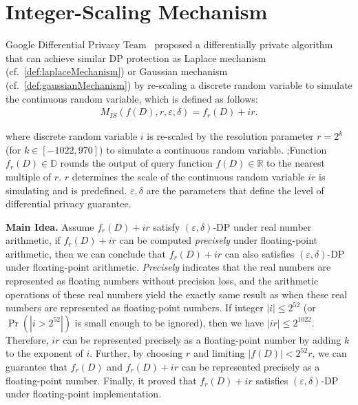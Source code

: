 

\section{Integer-Scaling Mechanism}
\label{sec:integerScalingMechanism}
Google Differential Privacy Team~\cite{googleDP2019} proposed a differentially private algorithm that can achieve similar DP protection as Laplace mechanism (cf.~\autoref{def:laplaceMechanism}) or Gaussian mechanism (cf.~\autoref{def:gaussianMechanism}) by re-scaling a discrete random variable to simulate the continuous random variable, which is defined as follows:
\begin{equation}
    \begin{split}
        M_{IS}\left(f\left(D\right),r, \varepsilon, \delta \right)=f_r\left(D\right) +ir.
    \end{split}
\end{equation}

where discrete random variable $i $ is re-scaled by the resolution parameter $r=2^k$ (for $k \in \left[-1022,970\right] $) to simulate a continuous random variable.
;Function $f_r\left(D\right)\in\mathbb{D} $ rounds the output of query function $f\left(D\right)\in\mathbb{R} $ to the nearest multiple of $r$.
$r$ determines the scale of the continuous random variable $ir$ is simulating and is predefined.
$\varepsilon, \delta$ are the parameters that define the level of differential privacy guarantee.

\textbf{Main Idea. } Assume $f_r\left(D\right) +ir$ satisfy $\left(\varepsilon, \delta\right) $-DP under real number arithmetic, if $f_r\left(D\right) +ir$ can be computed \textit{precisely} under floating-point arithmetic, then we can conclude that $f_r\left(D\right) +ir$ can also satisfies $\left(\varepsilon, \delta\right) $-DP under floating-point arithmetic. \textit{Precisely} indicates that the real numbers are represented as floating numbers without precision loss, and the arithmetic operations of these real numbers yield the exactly same result as when these real numbers are represented as floating-point numbers.
If integer $\left\lvert i\right\rvert \leq2^{52}$ (or $\Pr\left(\left\lvert i>2^{52}\right\rvert \right) $ is small enough to be ignored), then we have $    \left\lvert ir\right\rvert  \leq 2^{1022}$. Therefore, $ir$ can be represented precisely as a floating-point number by adding $k$ to the exponent of $i$. Further, by choosing $r$ and limiting $\left\lvert f\left(D\right)\right\rvert< 2^{52}r  $, we can guarantee that $f_r\left(D\right) $ and $f_r\left(D\right)+ir$ can be represented precisely as a floating-point number.
Finally, it proved that $f_r\left(D\right) +ir$ satisfies $\left(\varepsilon, \delta\right)$-DP under floating-point implementation.

